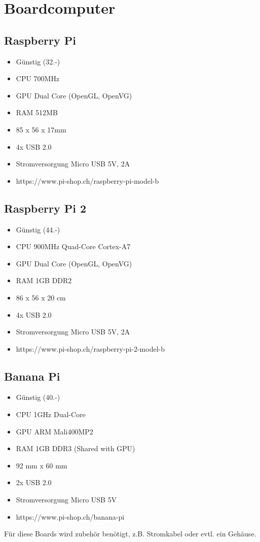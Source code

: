\section{Boardcomputer}

\subsection{Raspberry Pi}
\begin{itemize}
\item Günstig (32.-)
\item CPU 700MHz
\item GPU Dual Core (OpenGL, OpenVG)
\item RAM 512MB
\item 85 x 56 x 17mm
\item 4x USB 2.0
\item Stromversorgung Micro USB 5V, 2A
\item https://www.pi-shop.ch/raspberry-pi-model-b
\end{itemize}

\subsection{Raspberry Pi 2}
\begin{itemize}
\item Günstig (44.-)
\item CPU 900MHz Quad-Core Cortex-A7
\item GPU Dual Core (OpenGL, OpenVG)
\item RAM 1GB DDR2
\item 86 x 56 x 20 cm
\item 4x USB 2.0
\item Stromversorgung Micro USB 5V, 2A
\item https://www.pi-shop.ch/raspberry-pi-2-model-b
\end{itemize}

\subsection{Banana Pi}
\begin{itemize}
\item Günstig (40.-)
\item CPU 1GHz Dual-Core
\item GPU ARM Mali400MP2
\item RAM 1GB DDR3 (Shared with GPU)
\item 92 mm x 60 mm
\item 2x USB 2.0
\item Stromversorgung Micro USB 5V
\item https://www.pi-shop.ch/banana-pi
\end{itemize}

Für diese Boards wird zubehör benötigt, z.B. Stromkabel oder evtl. ein Gehäuse.

